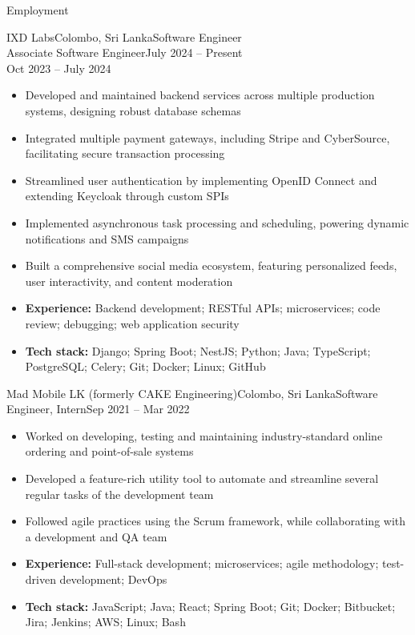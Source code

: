 \documentclass[garamond, a4paper]{modest-cv}
\begin{document}
	\makeheader

	\begin{cvsection}{Employment}
		\begin{cvsubsection}[3]{IXD Labs}{Colombo, Sri Lanka}{Software Engineer \\ Associate Software Engineer}{July 2024 -- Present \\ Oct 2023 -- July 2024}
			\begin{itemize}
				\item Developed and maintained backend services across multiple production systems, designing robust database schemas
				\item Integrated multiple payment gateways, including Stripe and CyberSource, facilitating secure transaction processing
				\item Streamlined user authentication by implementing OpenID Connect and extending Keycloak through custom SPIs
				\item Implemented asynchronous task processing and scheduling, powering dynamic notifications and SMS campaigns
				\item Built a comprehensive social media ecosystem, featuring personalized feeds, user interactivity, and content moderation
				\item \textbf{Experience:} Backend development; RESTful APIs; microservices; code review; debugging; web application security
				\item \textbf{Tech stack:} Django; Spring Boot; NestJS; Python; Java; TypeScript; PostgreSQL; Celery; Git; Docker; Linux; GitHub
			\end{itemize}
		\end{cvsubsection}
		\begin{cvsubsection}[2]{Mad Mobile LK \normalfont(formerly CAKE Engineering)}{Colombo, Sri Lanka}{Software Engineer, Intern}{Sep 2021 -- Mar 2022}
			\begin{itemize}
				\item Worked on developing, testing and maintaining industry-standard online ordering and point-of-sale systems
				\item Developed a feature-rich utility tool to automate and streamline several regular tasks of the development team
				\item Followed agile practices using the Scrum framework, while collaborating with a development and QA team
				\item \textbf{Experience:} Full-stack development; microservices; agile methodology; test-driven development; DevOps
				\item \textbf{Tech stack:} JavaScript; Java; React; Spring Boot; Git; Docker; Bitbucket; Jira; Jenkins; AWS; Linux; Bash
			\end{itemize}
		\end{cvsubsection}
	\end{cvsection}
\end{document}
